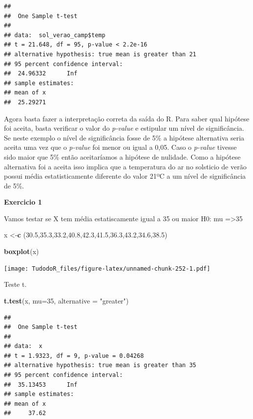 \documentclass[
]{book}
\newenvironment{Shaded}{\begin{snugshade}}{\end{snugshade}}
\newcommand{\DataTypeTok}[1]{\textcolor[rgb]{0.13,0.29,0.53}{#1}}
\newcommand{\DecValTok}[1]{\textcolor[rgb]{0.00,0.00,0.81}{#1}}
\newcommand{\FloatTok}[1]{\textcolor[rgb]{0.00,0.00,0.81}{#1}}
\newcommand{\KeywordTok}[1]{\textcolor[rgb]{0.13,0.29,0.53}{\textbf{#1}}}
\newcommand{\NormalTok}[1]{#1}
\newcommand{\StringTok}[1]{\textcolor[rgb]{0.31,0.60,0.02}{#1}}
\begin{document}
\begin{verbatim}
## 
##  One Sample t-test
## 
## data:  sol_verao_camp$temp
## t = 21.648, df = 95, p-value < 2.2e-16
## alternative hypothesis: true mean is greater than 21
## 95 percent confidence interval:
##  24.96332      Inf
## sample estimates:
## mean of x 
##  25.29271
\end{verbatim}

Agora basta fazer a interpretação correta da saída do R.
Para saber qual hipótese foi aceita, basta verificar o valor do \emph{p-value} e estipular um nível de significância. Se neste exemplo o nível de significância fosse de 5\% a hipótese alternativa seria aceita uma vez que o \emph{p-value} foi menor ou igual a 0,05. Caso o \emph{p-value} tivesse sido maior que 5\% então aceitaríamos a hipótese de nulidade.
Como a hipótese alternativa foi a aceita isso implica que a temperatura do ar no solsticio de verão possui média estatisticamente diferente do valor 21ºC a um nível de significância de 5\%.

\textbf{Exercicio 1}

Vamos testar se X tem média estatiscamente igual a 35 ou maior
H0: mu =\textgreater35

\begin{Shaded}
\begin{Highlighting}[]
\NormalTok{x <-}\KeywordTok{c}\NormalTok{ (}\FloatTok{30.5}\NormalTok{,}\FloatTok{35.3}\NormalTok{,}\FloatTok{33.2}\NormalTok{,}\FloatTok{40.8}\NormalTok{,}\FloatTok{42.3}\NormalTok{,}\FloatTok{41.5}\NormalTok{,}\FloatTok{36.3}\NormalTok{,}\FloatTok{43.2}\NormalTok{,}\FloatTok{34.6}\NormalTok{,}\FloatTok{38.5}\NormalTok{)}

\KeywordTok{boxplot}\NormalTok{(x)}
\end{Highlighting}
\end{Shaded}

\texttt{[image: TudodoR\_files/figure-latex/unnamed-chunk-252-1.pdf]}

Teste t.

\begin{Shaded}
\begin{Highlighting}[]
\KeywordTok{t.test}\NormalTok{(x,}
       \DataTypeTok{mu=}\DecValTok{35}\NormalTok{,}
       \DataTypeTok{alternative =} \StringTok{"greater"}\NormalTok{)}
\end{Highlighting}
\end{Shaded}

\begin{verbatim}
## 
##  One Sample t-test
## 
## data:  x
## t = 1.9323, df = 9, p-value = 0.04268
## alternative hypothesis: true mean is greater than 35
## 95 percent confidence interval:
##  35.13453      Inf
## sample estimates:
## mean of x 
##     37.62
\end{verbatim}
\end{document}

